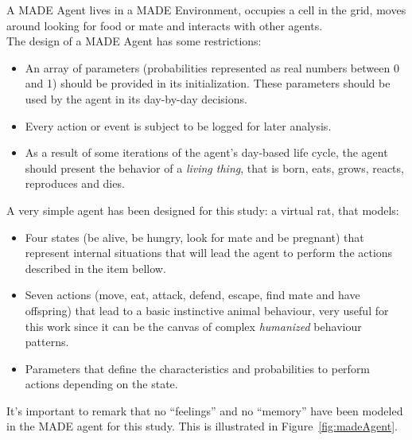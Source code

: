 \documentclass{sig-alternate}
\begin{document}

A MADE Agent lives in a MADE Environment, occupies a cell in the grid, moves around looking for food or mate and interacts with other agents.\\

The design of a MADE Agent has some restrictions:
\begin{itemize}
\item An array of parameters (probabilities represented as real numbers between 0 and 1) should be provided in its initialization. These parameters should be used by the agent in its day-by-day decisions.
\item Every action or event is subject to be logged for later analysis.
\item As a result of some iterations of the agent's day-based life cycle, the agent should present the behavior of a \textit{living thing}, that is born, eats, grows, reacts, reproduces and dies.  
\end{itemize}

A very simple agent has been designed for this study: a virtual
rat, that models:
\begin{itemize}
\item Four states (be alive, be hungry, look for
mate and be pregnant) that represent internal situations that will lead the
agent to perform the actions described in the item bellow. %
\item Seven actions (move, eat, attack, defend, escape,
find mate and have offspring) that lead to a basic instinctive animal
behaviour, very useful for this work since it can be the canvas of 
complex \textit{humanized} behaviour patterns.
\item Parameters that define the characteristics and probabilities to
perform actions depending on the state.
\end{itemize}
It's important to remark that no ``feelings'' and no ``memory''
have been modeled in the MADE agent for this study. This is
illustrated in Figure~\ref{fig:madeAgent}.
\end{document}
